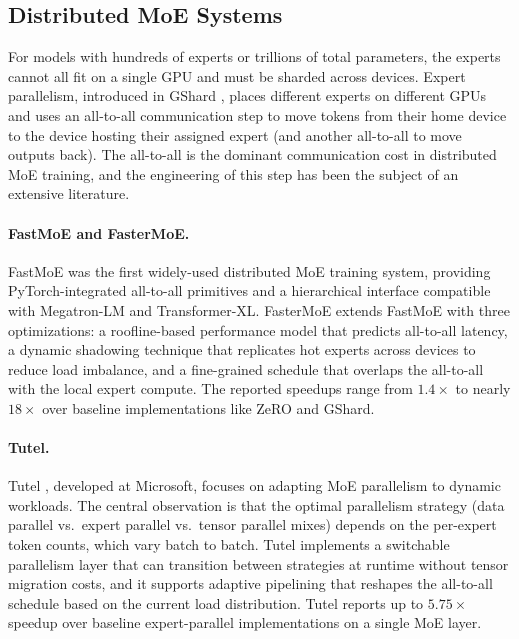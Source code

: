 \documentclass[10pt]{article}
\begin{document}
\subsection{Distributed MoE Systems}
\label{sec:moe-distributed}

For models with hundreds of experts or trillions of total parameters, the experts cannot all fit on a single GPU and must be sharded across devices. Expert parallelism, introduced in GShard \citep{lepikhin2021gshard}, places different experts on different GPUs and uses an all-to-all communication step to move tokens from their home device to the device hosting their assigned expert (and another all-to-all to move outputs back). The all-to-all is the dominant communication cost in distributed MoE training, and the engineering of this step has been the subject of an extensive literature.

\paragraph{FastMoE and FasterMoE.}
FastMoE \citep{he2021fastmoe} was the first widely-used distributed MoE training system, providing PyTorch-integrated all-to-all primitives and a hierarchical interface compatible with Megatron-LM and Transformer-XL. FasterMoE \citep{he2022fastermoe} extends FastMoE with three optimizations: a roofline-based performance model that predicts all-to-all latency, a dynamic shadowing technique that replicates hot experts across devices to reduce load imbalance, and a fine-grained schedule that overlaps the all-to-all with the local expert compute. The reported speedups range from $1.4\times$ to nearly $18\times$ over baseline implementations like ZeRO and GShard.

\paragraph{Tutel.}
Tutel \citep{hwang2023tutel}, developed at Microsoft, focuses on adapting MoE parallelism to dynamic workloads. The central observation is that the optimal parallelism strategy (data parallel vs.\ expert parallel vs.\ tensor parallel mixes) depends on the per-expert token counts, which vary batch to batch. Tutel implements a switchable parallelism layer that can transition between strategies at runtime without tensor migration costs, and it supports adaptive pipelining that reshapes the all-to-all schedule based on the current load distribution. Tutel reports up to $5.75\times$ speedup over baseline expert-parallel implementations on a single MoE layer.
\end{document}
